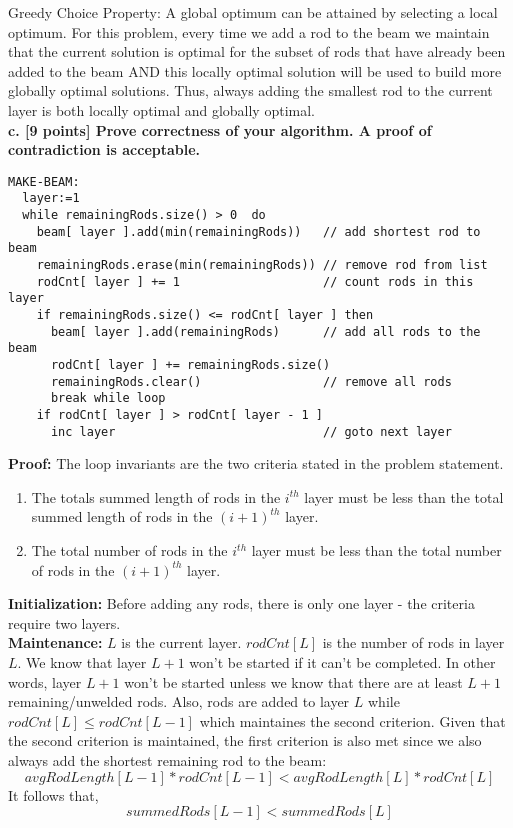 \documentclass[12pt]{article}
\begin{document}
Greedy Choice Property: A global optimum can be attained by selecting a local optimum. For this problem, every time we add a rod to the beam we maintain that the current solution is optimal for the subset of rods that have already been added to the beam AND this locally optimal solution will be used to build more globally optimal solutions. Thus, always adding the smallest rod to the current layer is both locally optimal and globally optimal. \\

\noindent \textbf{c. [9 points] Prove correctness of your algorithm. A proof of contradiction is acceptable.}

\begin{lstlisting}[frame=single]
MAKE-BEAM:
  layer:=1                                                        
  while remainingRods.size() > 0  do 
    beam[ layer ].add(min(remainingRods))   // add shortest rod to beam
    remainingRods.erase(min(remainingRods)) // remove rod from list
    rodCnt[ layer ] += 1                    // count rods in this layer
    if remainingRods.size() <= rodCnt[ layer ] then
      beam[ layer ].add(remainingRods)      // add all rods to the beam
      rodCnt[ layer ] += remainingRods.size()
      remainingRods.clear()                 // remove all rods 
      break while loop
    if rodCnt[ layer ] > rodCnt[ layer - 1 ]
      inc layer                             // goto next layer
\end{lstlisting} 

\noindent \textbf{Proof: } 
The loop invariants are the two criteria stated in the problem statement.
\begin{enumerate}
  \item The totals summed length of rods in the $i^{th}$ layer must be less
    than the total summed length of rods in the $(i+1)^{th}$ layer.
  \item The total number of rods in the $i^{th}$ layer must be less than the
    total number of rods in the $(i+1)^{th}$ layer.
\end{enumerate}

\noindent \textbf{Initialization: } Before adding any rods, there is only one layer - the criteria require two layers. \\
\noindent \textbf{Maintenance: } $L$ is the current layer. $rodCnt[ L ]$ is the number of rods in layer $L$. 
We know that layer $L+1$ won't be started if it can't be completed. In other words, layer $L+1$ won't 
be started unless we know that there are at least $L+1$ remaining/unwelded rods. 
Also, rods are added to layer $L$ while $rodCnt[ L ] \le rodCnt[ L-1 ]$ which maintaines the 
second criterion.
Given that the second criterion is maintained, the first criterion is also met since we also always 
add the shortest remaining rod to the beam:
\[ 
avgRodLength[ L-1 ] * rodCnt[ L-1 ] < avgRodLength[ L ] * rodCnt[ L ] 
\]
It follows that, 
\[
    summedRods[ L-1 ] < summedRods[ L ]
\]
\end{document}
